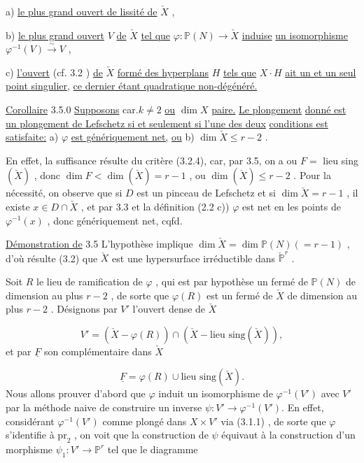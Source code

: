 a) \underline{le plus grand ouvert de lissité de} $\check{X}$ ,

b) \underline{le plus grand ouvert} $V$ \underline{de} $\check{X}$ \underline{tel que} $\varphi : \mathbb{P}(N) \longrightarrow \check{X}$ \underline{induise} \underline{un isomorphisme} $\varphi^{-1}(V) \stackrel{\sim}{\longrightarrow} V$ ,

c) \underline{l'ouvert} (cf. 3.2 ) \underline{de} $\check{X}$ \underline{formé des hyperplans} $H$ \underline{tels que} $X \cdot H$ \underline{ait un et un seul point singulier,} \underline{ce dernier étant quadratique non-dégénéré.}

\underline{Corollaire} 3.5.0 \underline{Supposons} car.$k \neq 2$ \underline{ou} $\dim X$ \underline{paire.} \underline{Le plongement} \underline{donné est un plongement de Lefschetz si et seulement si l'une des deux} \underline{conditions est satisfaite:} a) $\varphi$ \underline{est génériquement net,} \underline{ou} b) $\dim \check{X} \leqslant r-2$ .

En effet, la suffisance résulte du critère (3.2.4), car, par 3.5, on a ou $F =$ lieu sing$(\check{X})$ , donc $\dim F < \dim(\check{X}) = r-1$ , ou $\dim(\check{X}) \leqslant r-2$ . Pour la nécessité, on observe que si $D$ est un pinceau de Lefschetz et si $\dim \check{X} = r-1$ , il existe $x \in D \cap \check{X}$ , et par 3.3 et la définition (2.2 c)) $\varphi$ est net en les points de $\varphi^{-1}(x)$ , donc génériquement net, cqfd.

\underline{Démonstration de} 3.5 L'hypothèse implique $\dim \check{X} = \dim \mathbb{P}(N)(=r-1)$ , d'où résulte (3.2) que $\check{X}$ est une hypersurface irréductible dans $\check{\mathbb{P}}^r$ .



Soit $R$ le lieu de ramification de $\varphi$ , qui est par hypothèse un fermé de $\mathbb{P}(N)$ de dimension au plus $r-2$ , de sorte que $\varphi(R)$ est un fermé de $\check{X}$ de dimension au plus $r-2$ . Désignons par $V'$ l'ouvert dense de $\check{X}$

\begin{equation}\tag{3.5.1}
V' = (\check{X} - \varphi(R)) \cap (\check{X} - \text{lieu sing}(\check{X})) ,
\end{equation}
et par $\underline{F}$ son complémentaire dans $\check{X}$

\begin{equation}\tag{3.5.1.1}
\underline{F} = \varphi(R) \cup \text{lieu sing}(\check{X}) .
\end{equation}
Nous allons prouver d'abord que $\varphi$ induit un isomorphisme de $\varphi^{-1}(V')$ avec $V'$ par la méthode naive de construire un inverse $\psi : V' \longrightarrow \varphi^{-1}(V')$. En effet, considérant $\varphi^{-1}(V')$ comme plongé dans $X \times V'$ via (3.1.1) , de sorte que $\varphi$ s'identifie à $\mathrm{pr}_2$ , on voit que la construction de $\psi$ équivaut à la construction d'un morphisme $\psi_1 : V' \longrightarrow \mathbb{P}^r$ tel que le diagramme

